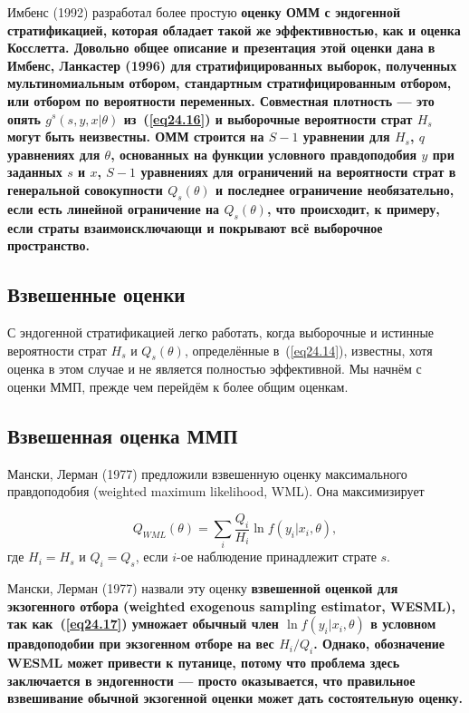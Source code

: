 Имбенс (1992) разработал более простую \bfseries оценку ОММ с эндогенной стратификацией, \mdseries которая обладает такой же эффективностью, как и оценка Косслетта. Довольно общее описание и презентация этой оценки дана в Имбенс, Ланкастер (1996) для стратифицированных выборок, полученных мультиномиальным отбором, стандартным стратифицированным отбором, или отбором по вероятности переменных. Совместная плотность --- это опять $g^s(s,y,x|\theta)$ из~(\ref{eq24.16}) и выборочные вероятности страт $H_s$ могут быть неизвестны. ОММ строится на $S-1$ уравнении для $H_s$, $q$ уравнениях для $\theta$, основанных на функции условного правдоподобия $y$ при заданных $s$ и $x$, $S-1$ уравнениях для ограничений на вероятности страт в генеральной совокупности $Q_s(\theta)$ и последнее ограничение необязательно, если есть линейной ограничение на $Q_s(\theta)$, что происходит, к примеру, если страты взаимоисключающи и покрывают всё выборочное пространство. 

\subsection{Взвешенные оценки}

С эндогенной стратификацией легко работать, когда выборочные и истинные вероятности страт $H_s$ и $Q_s(\theta)$, определённые в~(\ref{eq24.14}), известны, хотя оценка в этом случае и не является полностью эффективной. Мы начнём с оценки ММП, прежде чем перейдём к более общим оценкам. 

\subsection*{Взвешенная оценка ММП}

Мански, Лерман (1977) предложили взвешенную оценку максимального правдоподобия (weighted maximum likelihood, WML). Она максимизирует

\begin{equation}
\label{eq24.17}
Q_{WML}(\theta) = \sum_i \frac{Q_i}{H_i} \ln f(y_i|x_i,\theta),
\end{equation}
где $H_i = H_s$ и $Q_i = Q_s$, если $i$-ое наблюдение принадлежит страте $s$. 

Мански, Лерман (1977) назвали эту оценку \bfseries взвешенной оценкой для экзогенного отбора \mdseries (weighted exogenous sampling estimator, WESML), так как~(\ref{eq24.17}) умножает обычный член $\ln f(y_i|x_i,\theta)$ в условном правдоподобии при экзогенном отборе на вес $H_i/Q_i$. Однако, обозначение WESML может привести к путанице, потому что проблема здесь заключается в эндогенности --- просто оказывается, что правильное взвешивание обычной экзогенной оценки может дать состоятельную оценку. 

